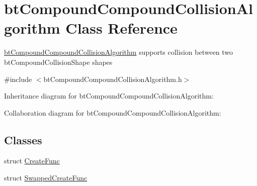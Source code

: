 \hypertarget{classbt_compound_compound_collision_algorithm}{\section{bt\+Compound\+Compound\+Collision\+Algorithm Class Reference}
\label{classbt_compound_compound_collision_algorithm}
}


\hyperlink{classbt_compound_compound_collision_algorithm}{bt\+Compound\+Compound\+Collision\+Algorithm} supports collision between two bt\+Compound\+Collision\+Shape shapes  




{\ttfamily \#include $<$bt\+Compound\+Compound\+Collision\+Algorithm.\+h$>$}



Inheritance diagram for bt\+Compound\+Compound\+Collision\+Algorithm\+:


Collaboration diagram for bt\+Compound\+Compound\+Collision\+Algorithm\+:
\subsection*{Classes}
\begin{DoxyCompactItemize}
\item 
struct \hyperlink{structbt_compound_compound_collision_algorithm_1_1_create_func}{Create\+Func}
\item 
struct \hyperlink{structbt_compound_compound_collision_algorithm_1_1_swapped_create_func}{Swapped\+Create\+Func}
\end{DoxyCompactItemize}
